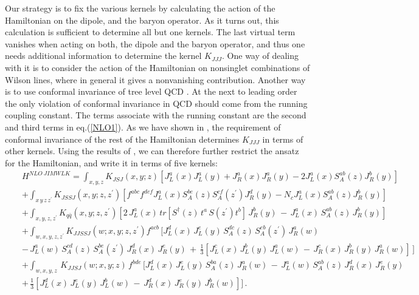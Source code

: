 \documentclass[11pt,a4paper]{article}
\begin{document}
 Our strategy is to fix the various kernels by calculating the action of the Hamiltonian on the dipole, and the baryon operator. 
 As it turns out, this calculation is sufficient to determine all but one kernels. The last virtual term vanishes when acting on both, the dipole and the baryon operator, and thus one needs additional information to determine the kernel $K_{JJJ}$. One way of dealing with it is to consider the action of the Hamiltonian on nonsinglet combinations of Wilson lines, where in general it gives a nonvanishing contribution. Another way is to use conformal invariance of tree level QCD \cite{KLMconf}. At the next to leading order the only violation of conformal invariance in QCD should come from the running coupling constant. The terms associate with the running constant are the second and third terms in eq.(\ref{NLO1}). 
 As we have shown in \cite{KLMconf}, the requirement of conformal invariance of the rest of the Hamiltonian determines $K_{JJJ}$ in terms of other kernels. Using the results of  
 \cite{KLMconf}, we can therefore further restrict the ansatz for the Hamiltonian, and write it in terms of five kernels: 
\begin{eqnarray}\label{NLO}
&&H^{NLO\ JIMWLK}= \int_{x,y,z} K_{JSJ}(x,y;z) \left[ J^a_L(x)J^a_L(y)+J_R^a(x)J_R^a(y)-2J_L^a(x)S_A^{ab}(z)J^b_R(y)\right]  \nonumber \\
 &&+\int_{x\,y\, z\,z^\prime}K_{JSSJ}(x,y;z,z^\prime)\left[f^{abc}f^{def}J_L^a(x) S^{be}_A(z)S^{cf}_A(z^\prime)J_R^d(y)- N_c J_L^a(x)S^{ab}_A(z)J^b_R(y)\right] 
 \nonumber \\
 &&+\int_{x,y, z,z^\prime} K_{q\bar q}(x,y;z,z^\prime)\left[2\,J_L^a(x) \,tr[S^\dagger(z)\, t^a\,S (z^\prime)t^b]\,J_R^b(y)\,
 -\, J_L^a(x)\,S^{ab}_A(z)\,J^b_R(y)\right] \nonumber \\
 &&+\int_{w,x,y, z,z^\prime}K_{JJSSJ}(w;x,y;z,z^\prime)f^{acb}\,\Big[J_L^d(x)\, J_L^e(y)\, S^{dc}_A(z)\,S^{eb}_A(z^\prime)\,J_R^a(w)\nonumber \\
 &&-\,J_L^a(w)\,S^{cd}_A(z)\,S^{be}_A (z^\prime)\,J_R^d(x)\,J_R^e(y)\, +\,\frac{1}{3}[J_L^c(x) \,J_L^b(y) \,J_L^a(w)\,-\, 
J_R^c(x) \,J_R^b(y)\,J_R^a(w)]\,\Big] \nonumber \\
 &&+\int_{w,x,y, z}\, K_{JJSJ}(w;x,y;z)\,f^{bde}\,\Big[  J_L^d(x) \,J_L^e(y) \,S^{ba}_A(z)\,J_R^a(w)\,-\, 
J_L^a(w)\,S^{ab}_A(z)\,J_R^d(x)\,J_R^e(y) \,  \nonumber \\
 &&+\,\frac{1}{3}[J_L^d(x) \,J_L^e(y) \,J_L^b(w)\,-\, 
J_R^d(x)\,J_R^e(y)\,J_R^b(w)]
\Big] \,.
\end{eqnarray}
\end{document}
